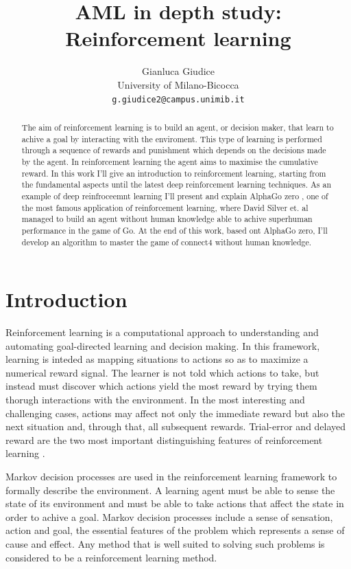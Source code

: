 \documentclass{article}
\title{AML in depth study: Reinforcement learning}
\author{
 Gianluca Giudice\\
  University of Milano-Bicocca\\
  \texttt{g.giudice2@campus.unimib.it} \\
}
\begin{document}
\maketitle
\begin{abstract}
The aim of reinforcement learning is to build an agent, or decision maker, that learn to achive a goal by interacting with the enviroment. This type of learning is performed through a sequence of rewards and punishment which depends on the decisions made by the agent. In reinforcement learning the agent aims to maximise the cumulative reward. In this work I'll give an introduction to reinforcement learning, starting from the fundamental aspects until the latest deep reinforcement learning techniques. As an example of deep reinfroceemnt learning I'll present and explain AlphaGo zero \cite{silver2017mastering}, one of the most famous application of reinforcement learning, where David Silver et. al managed to build an agent without human knowledge able to achive superhuman performance in the game of Go. At the end of this work, based ont AlphaGo zero, I'll develop an algorithm to master the game of connect4 without human knowledge.
\end{abstract}

\section{Introduction}

Reinforcement learning is a computational approach to understanding and automating goal-directed learning and decision making. In this framework, learning is inteded as mapping situations to actions so as to maximize a numerical reward signal. The learner is not told which actions to take, but instead must discover which actions yield the most reward by trying them thorugh interactions with the environment. In the most interesting and challenging cases, actions may affect not only the immediate reward but also the next situation and, through that, all subsequent rewards. Trial-error and delayed reward  are the two most important distinguishing features of reinforcement learning \cite{10.5555/3312046}.

Markov decision processes are used in the reinforcement learning framework to formally describe the environment. A learning agent must be able to sense the state of its environment and must be able to take actions that affect the state in order to achive a goal. Markov decision processes include a sense of sensation, action and goal, the essential features of the problem which represents a sense of cause and effect. Any method that is well suited to solving such problems is considered to be a reinforcement learning method.
\end{document}
